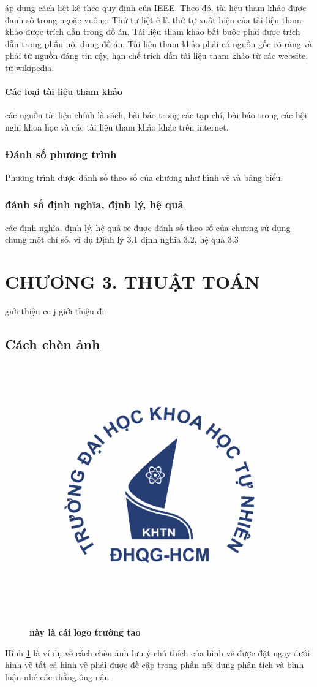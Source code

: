 \documentclass{article}
\begin{document}
áp dụng cách liệt kê theo quy định của IEEE. Theo đó, tài liệu tham khảo được đanh số trong ngoặc vuông. Thứ tự liệt ê là thứ tự xuất hiện của tài liệu tham khảo được trích dẫn trong đồ án. Tài liệu tham khảo bắt buộc phải được trích dẫn trong phần nội dung đồ án. Tài liệu tham khảo phải có nguồn gốc rõ ràng và phải từ nguồn đáng tin cậy, hạn chế trích dẫn tài liệu tham khảo từ các website, từ wikipedia.
\paragraph{Các loại tài liệu tham khảo}\mbox{}
các nguồn tài liệu chính là sách, bài báo trong các tạp chí, bài báo trong các hội nghị khoa học và các tài liệu tham khảo khác trên internet.
\subsubsection{Đánh số phương trình}
Phương trình được đánh số theo số của chương như hình vẽ và bảng biểu.
\subsubsection{đánh số định nghĩa, định lý, hệ quả}
các định nghĩa, định lý, hệ quả sẽ được đánh số theo số của chương sử dụng chung một chỉ số. ví dụ Định lý 3.1 định nghĩa 3.2, hệ quả 3.3


\newpage
\section*{CHƯƠNG 3. THUẬT TOÁN}
\setcounter{section}{3}
giới thiệu cc j giới thiệu đi
\subsection{Cách chèn ảnh }
\setcounter{figure}{0}%
\begin{figure}[H]
    \centering
    \includegraphics[width=0.5\linewidth]{logohcmus.png}
    \caption{\bfseries\fontsize{12pt}{0pt} này là cái logo trường tao}
    \label{hinh3.1}
\end{figure}
Hình \ref{hinh3.1} là ví dụ về cách chèn ảnh lưu ý chú thích của hình vẽ được đặt ngay dưới hình vẽ tất cả hình vẽ phải được đề cập trong phần nội dung phân tích và bình luận nhé các thằng ông nậu
\end{document}
